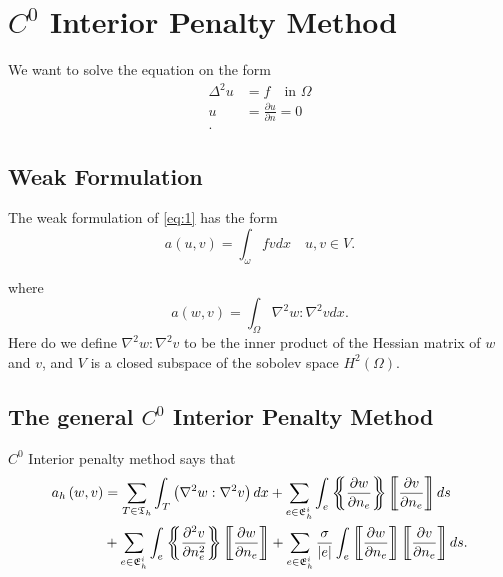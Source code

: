 \section{$C^0$ Interior Penalty Method}\label{sec:ch1}


We want to solve the equation on the form
\begin{align}
    \label{eq:1}
    \Delta ^{2} u &= f \quad \text{in } \Omega  \\
    u &= \frac{\partial u}{\partial n} = 0  \\
.\end{align}

\subsection{Weak Formulation}%
\label{sub:weak_formulation}


The weak formulation of \eqref{eq:1} has the form
\begin{equation}
\label{eq:2}
    a\left( u,v \right) = \int_{\omega}^{} f v dx \quad u,v \in V
.\end{equation}

where
\begin{equation}
\label{eq:3}
    a\left( w,v \right) = \int_{\Omega }^{} \nabla ^2 w : \nabla ^2 v dx
.\end{equation}
Here do we define $\nabla ^2 w : \nabla ^2 v $ to be the inner product of the Hessian matrix of $w$  and $v$, and $V$
is a closed subspace of the sobolev space $H^2\left( \Omega  \right)$.


\subsection{The general $C^0$ Interior Penalty Method}%
\label{sub:_c_0_interior_penalty_method}


$C^{0}$ Interior penalty method says that
\begin{align*}
    a_{h} \left( w,v \right) &= \sum_{T \in \mathfrak{T} _{h}}^{} \int_{T}^{} \left( \nabla ^2 w : \nabla ^2 v \right)
    dx  + \sum_{e \in \mathfrak{E} _{h}^{i}}^{} \int_{e}^{} \mean{ \frac{\partial w}{\partial n_{e}} } \jump{
    \frac{\partial v}{\partial n_{e}} } ds        \\
    & + \sum_{e \in \mathfrak{E} _{h}^{i}}^{}  \int_{e}^{}  \mean{ \frac{\partial ^2 v}{\partial n_{e}^2 } } \jump{
    \frac{\partial w}{\partial n_{e}} }     + \sum_{e \in \mathfrak{E} _{h}^{i}}^{}  \frac{\sigma }{\left\lvert e
\right\rvert } \int_{e}^{} \jump{ \frac{\partial w}{\partial n_{e}} } \jump{ \frac{\partial v}{\partial n_{e}} } ds
.\end{align*}

